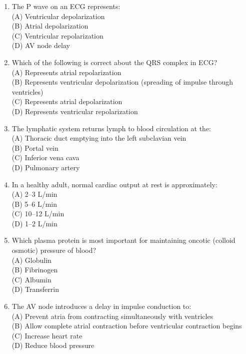 \documentclass{article}
\begin{document}
\begin{enumerate}[label=Q\arabic*.]
\item The P wave on an ECG represents:
\\(A) Ventricular depolarization
\\(B) Atrial depolarization
\\(C) Ventricular repolarization
\\(D) AV node delay

\item Which of the following is correct about the QRS complex in ECG?
\\(A) Represents atrial repolarization
\\(B) Represents ventricular depolarization (spreading of impulse through ventricles)
\\(C) Represents atrial depolarization
\\(D) Represents ventricular repolarization

\item The lymphatic system returns lymph to blood circulation at the:
\\(A) Thoracic duct emptying into the left subclavian vein
\\(B) Portal vein
\\(C) Inferior vena cava
\\(D) Pulmonary artery

\item In a healthy adult, normal cardiac output at rest is approximately:
\\(A) 2--3 L/min
\\(B) 5--6 L/min
\\(C) 10--12 L/min
\\(D) 1--2 L/min

\item Which plasma protein is most important for maintaining oncotic (colloid osmotic) pressure of blood?
\\(A) Globulin
\\(B) Fibrinogen
\\(C) Albumin
\\(D) Transferrin

\item The AV node introduces a delay in impulse conduction to:
\\(A) Prevent atria from contracting simultaneously with ventricles
\\(B) Allow complete atrial contraction before ventricular contraction begins
\\(C) Increase heart rate
\\(D) Reduce blood pressure


\end{enumerate}
\end{document}
